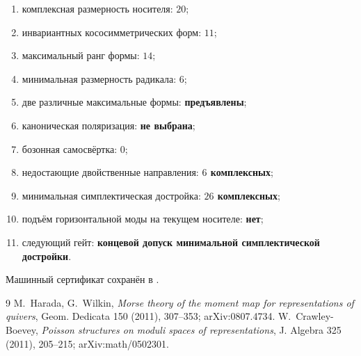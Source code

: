 \begin{protocol}
\begin{enumerate}
 \item комплексная размерность носителя: \textbf{$20$};
 \item инвариантных кососимметрических форм: \textbf{$11$};
 \item максимальный ранг формы: \textbf{$14$};
 \item минимальная размерность радикала: \textbf{$6$};
 \item две различные максимальные формы: \textbf{предъявлены};
 \item каноническая поляризация: \textbf{не выбрана};
 \item бозонная самосвёртка: \textbf{$0$};
 \item недостающие двойственные направления: \textbf{$6$ комплексных};
 \item минимальная симплектическая достройка: \textbf{$26$ комплексных};
 \item подъём горизонтальной моды на текущем носителе: \textbf{нет};
 \item следующий гейт: \textbf{концевой допуск минимальной симплектической
 достройки}.
\end{enumerate}
\end{protocol}

Машинный сертификат сохранён в
.

\begin{thebibliography}{9}
M.~Harada, G.~Wilkin,
\emph{Morse theory of the moment map for representations of quivers},
Geom. Dedicata 150 (2011), 307--353; arXiv:0807.4734.
W.~Crawley-Boevey,
\emph{Poisson structures on moduli spaces of representations},
J. Algebra 325 (2011), 205--215; arXiv:math/0502301.
\end{thebibliography}